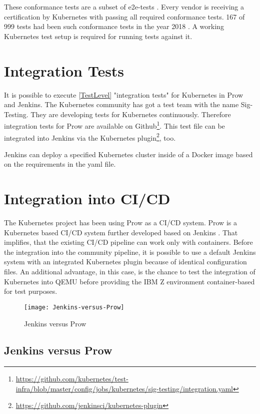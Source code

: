 These conformance tests are a subset of e2e-tests \cite[~p.8]{Omichi2018}. Every vendor is receiving a certification by Kubernetes with passing all required conformance tests. 167 of 999 tests had been such conformance tests in the year 2018 \cite[~p.9]{Omichi2018}.
A working Kubernetes test setup is required for running tests against it.


\section{Integration Tests} \label{Kub-IntegrationTest}

It is possible to execute \ref{TestLevel} "integration tests" for Kubernetes in Prow and Jenkins.
The Kubernetes community has got a test team with the name Sig-Testing. They are developing tests for Kubernetes continuously. Therefore integration tests for Prow are available on Github\footnote{\url{https://github.com/kubernetes/test-infra/blob/master/config/jobs/kubernetes/sig-testing/integration.yaml}}. This test file can be integrated into Jenkins via the Kubernetes plugin\footnote{\url{https://github.com/jenkinsci/kubernetes-plugin}}, too.

Jenkins can deploy a specified Kubernetes cluster inside of a Docker image based on the requirements in the yaml file.

\section{Integration into CI/CD}

The Kubernetes project has been using Prow as a \gls{CI/CD} system. Prow is a Kubernetes based \gls{CI/CD} system further developed based on Jenkins \cite{JAXenter}. That implifies, that the existing \gls{CI/CD} pipeline can work only with containers.
Before the integration into the community pipeline, it is possible to use a default Jenkins system with an integrated Kubernetes plugin because of identical configuration files. An additional advantage, in this case, is the chance to test the integration of Kubernetes into \gls{QEMU} before providing the IBM Z environment container-based for test purposes.

\begin{figure}[H]
\centering
\texttt{[image: Jenkins-versus-Prow]}
 \caption{Jenkins versus Prow}
    \label{JenkinsProw}
\end{figure}


\subsection{Jenkins versus Prow}

